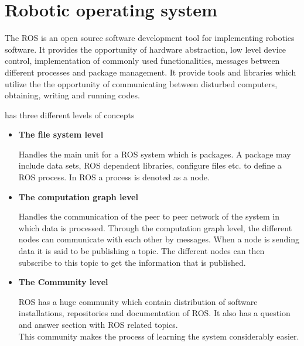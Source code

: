 \section{Robotic operating system}\label{sec:def_ROS}

The \gls{ROS} is an open source software development tool for implementing robotics software. It provides the opportunity of hardware abstraction, low level device control, implementation of commonly used functionalities, messages between different processes and package management\cite{wiki_ros}. It provide tools and libraries which utilize the the opportunity of communicating between disturbed computers, obtaining, writing and running codes.


 has three different levels of concepts\cite{Wiki_ros_concepts}

\begin{itemize}
\item \textbf{The file system level}

Handles the main unit for a ROS system which is packages. A package may include data sets, \gls{ROS} dependent libraries, configure files etc. to define a \gls{ROS} process. In \gls{ROS} a process is denoted as a node. 
\item \textbf{The computation graph level}

Handles the communication of the peer to peer network of the system in which data is processed. Through the computation graph level, the different nodes can communicate with each other by messages. When a node is sending data it is said to be publishing a topic. The different nodes can then subscribe to this topic to get the information that is published.
\item \textbf{The Community level}

ROS has a huge community which contain distribution of software installations, repositories and documentation of ROS. It also has a question and answer section with ROS related topics.\\
This community makes the process of learning the system considerably easier.
\end{itemize}
